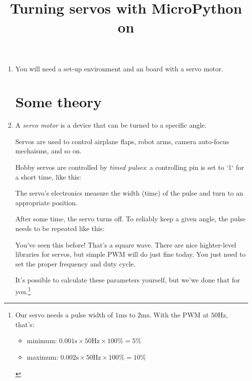 \documentclass{../tutorial}
\title{Turning servos with MicroPython on \abbr{ESP32}}
\begin{document}
\begin{enumerate}

\item
    You will need a set-up environment and an  board
    with a servo motor.

\section{Some theory}

\item
    A \emph{servo motor} is a device that can be turned to a specific angle.

    Servos are used to control airplane flaps, robot arms,
    camera auto-focus mechaisms, and so on.

    Hobby servos are controlled by \emph{timed pulses}: a controlling pin is
    set to `1` for a short time, like this:

    \begin{figure}[h]
        \centering
    \end{figure}

    \begin{figure}[h]
        \centering
    \end{figure}

    The servo's electronics measure the width (time) of the pulse and
    turn to an appropriate position.

    After some time, the servo turns off.
    To reliably keep a given angle,
    the pulse needs to be repeated like this:

    \begin{figure}[h]
        \centering
    \end{figure}

    You've seen this before! That's a square wave.
    There are nice highter-level libraries for servos,
    but simple PWM will do just fine today.
    You just need to set the proper frequency and duty cycle.

    It's possible to calculate these parameters yourself, but we'we done that
    for you.\footnote{
        Our servo needs a pulse width of
        $1 \si{\milli\second}$ to $2 \si{\milli\second}$.
        With the PWM at $50 \si{\hertz}$, that's:

        \begin{itemize}
        \item minimum:
            ${0.001 \si{\second}} \times {50 \si{\hertz}} \times 100\% = 5\%$
        \item maximum:
            ${0.002 \si{\second}} \times {50 \si{\hertz}} \times 100\% = 10\%$
        \end{itemize}

}
\end{enumerate}
\end{document}
